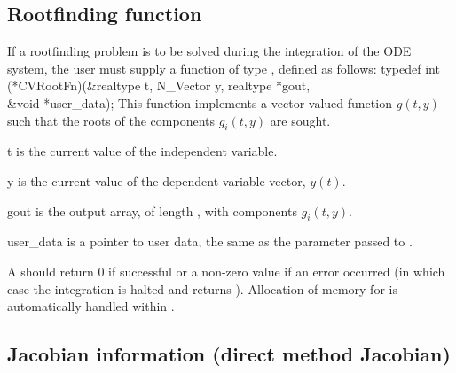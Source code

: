 \subsection{Rootfinding function}\label{ss:rootFn}
If a rootfinding problem is to be solved during the integration of the ODE system,
the user must supply a {\CC} function of type , defined as follows:
{
  typedef int (*CVRootFn)(&realtype t, N\_Vector y, realtype *gout, \\
                          &void *user\_data);
}
{
  This function implements a vector-valued function $g(t,y)$ such that the roots of 
  the  components $g_i(t,y)$ are sought.
}
{
  \begin{args}
  \item[t]
    is the current value of the independent variable.
  \item[y]
    is the current value of the dependent variable vector, $y(t)$.
  \item[gout]
    is the output array, of length , with components $g_i(t,y)$.
  \item[user\_data]
    is a pointer to user data, the same as the       
    parameter passed to .   
  \end{args}
}
{
  A  should return 0 if successful or a non-zero value if
  an error occurred (in which case the integration is halted and  returns
  ).
}
{
  Allocation of memory for  is automatically handled within {\cvode}.
}


\subsection{Jacobian information (direct method Jacobian)}
\label{ss:jacFn}

